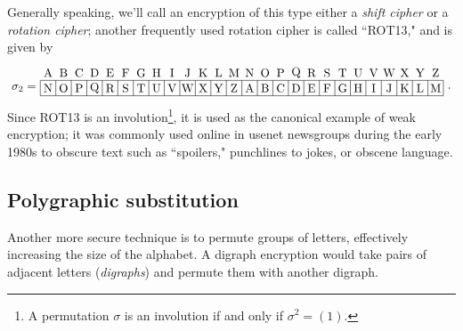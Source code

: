 \documentclass[m3380-lec-main.tex]{subfiles}
\begin{document}
Generally speaking, we'll call an encryption of this type either a \emph{shift cipher} or a \emph{rotation cipher}; another frequently used rotation cipher is called ``ROT13," and is given by
{\tiny\[\begin{tikzpicture}[scale=12/26]
\draw (0,0.5) node [left] {$\sigma_2 =$} (0,0) grid (26,1) (26,0.5) node [right] {.};
\draw
    \foreach \x/\y in {A/0, B/1, C/2, D/3, E/4, F/5, G/6, H/7, I/8, J/9, K/10, L/11, M/12, N/13, O/14, P/15, Q/16, R/17, S/18, T/19, U/20, V/21, W/22, X/23, Y/24, Z/25}{ (\y+.5, 1.5) node {\x}}
    \foreach \x/\y in {N/0, O/1, P/2, Q/3, R/4, S/5, T/6, U/7, V/8, W/9, X/10, Y/11, Z/12, A/13, B/14, C/15, D/16, E/17, F/18, G/19, H/20, I/21, J/22, K/23, L/24, M/25}{ (\y+.5, 0.5) node {\x}};
\end{tikzpicture}
\]}
Since ROT13 is an involution\footnote{A permutation $\sigma$ is an involution if and only if $\sigma^2=(1)$.}, it is used as the canonical example of weak encryption; it was commonly used online in usenet newsgroups during the early 1980s to obscure text such as ``spoilers," punchlines to jokes, or obscene language.

\subsection{Polygraphic substitution} Another more secure technique is to permute groups of letters, effectively increasing the size of the alphabet. A digraph encryption would take pairs of adjacent letters (\emph{digraphs}) and permute them with another digraph. 
\end{document}
